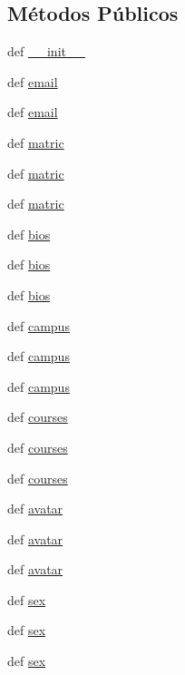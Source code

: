 \subsection*{Métodos Públicos}
\begin{DoxyCompactItemize}
\item 
def \hyperlink{classELO_1_1EntityUnit_1_1Professor_a9c5d85cebcb21faceb88528595762d8a}{\-\_\-\-\_\-init\-\_\-\-\_\-}
\item 
def \hyperlink{classELO_1_1EntityUnit_1_1Professor_ab3f1db18ae629280f0476760411e1633}{email}
\item 
def \hyperlink{classELO_1_1EntityUnit_1_1Professor_ab3f1db18ae629280f0476760411e1633}{email}
\item 
def \hyperlink{classELO_1_1EntityUnit_1_1Professor_aeed7183438ff461d33bd0f7a9d179058}{matric}
\item 
def \hyperlink{classELO_1_1EntityUnit_1_1Professor_aeed7183438ff461d33bd0f7a9d179058}{matric}
\item 
def \hyperlink{classELO_1_1EntityUnit_1_1Professor_aeed7183438ff461d33bd0f7a9d179058}{matric}
\item 
def \hyperlink{classELO_1_1EntityUnit_1_1Professor_a2972bd0f21f4ff0ebfb1cada717386ac}{bios}
\item 
def \hyperlink{classELO_1_1EntityUnit_1_1Professor_a2972bd0f21f4ff0ebfb1cada717386ac}{bios}
\item 
def \hyperlink{classELO_1_1EntityUnit_1_1Professor_a2972bd0f21f4ff0ebfb1cada717386ac}{bios}
\item 
def \hyperlink{classELO_1_1EntityUnit_1_1Professor_a561d5ad5396226805832c6e4cef1bd10}{campus}
\item 
def \hyperlink{classELO_1_1EntityUnit_1_1Professor_a561d5ad5396226805832c6e4cef1bd10}{campus}
\item 
def \hyperlink{classELO_1_1EntityUnit_1_1Professor_a561d5ad5396226805832c6e4cef1bd10}{campus}
\item 
def \hyperlink{classELO_1_1EntityUnit_1_1Professor_adad835563fb2eba52ed5015abaf8808f}{courses}
\item 
def \hyperlink{classELO_1_1EntityUnit_1_1Professor_adad835563fb2eba52ed5015abaf8808f}{courses}
\item 
def \hyperlink{classELO_1_1EntityUnit_1_1Professor_adad835563fb2eba52ed5015abaf8808f}{courses}
\item 
def \hyperlink{classELO_1_1EntityUnit_1_1Professor_a158f4ccf788610ba580639216b621c5b}{avatar}
\item 
def \hyperlink{classELO_1_1EntityUnit_1_1Professor_a158f4ccf788610ba580639216b621c5b}{avatar}
\item 
def \hyperlink{classELO_1_1EntityUnit_1_1Professor_a158f4ccf788610ba580639216b621c5b}{avatar}
\item 
def \hyperlink{classELO_1_1EntityUnit_1_1Professor_a2244fa9a5f02a5845cc6c0686b2cf08a}{sex}
\item 
def \hyperlink{classELO_1_1EntityUnit_1_1Professor_a2244fa9a5f02a5845cc6c0686b2cf08a}{sex}
\item 
def \hyperlink{classELO_1_1EntityUnit_1_1Professor_a2244fa9a5f02a5845cc6c0686b2cf08a}{sex}
\end{DoxyCompactItemize}
